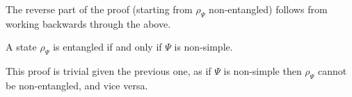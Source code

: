 The reverse part of the proof (starting from $\rho_{\Psi}$ non-entangled) follows from working backwards through the above. 
\eq 

\bl 
A state $\rho_{\Psi}$ is entangled if and only if $\Psi$ is non-simple. 
\el 

\bq 
This proof is trivial given the previous one, as if $\Psi$ is non-simple then $\rho_{\Psi}$ cannot be non-entangled, and vice versa. 
\eq 